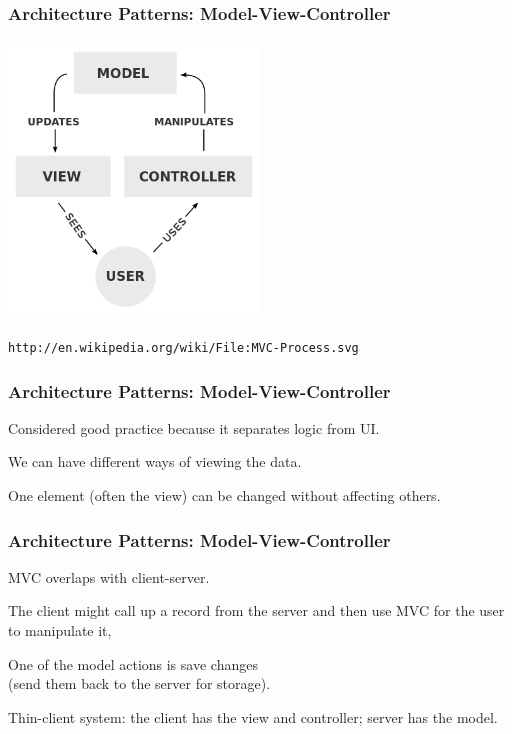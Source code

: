 \begin{frame}
\frametitle{Architecture Patterns: Model-View-Controller}
\begin{center}

	\includegraphics[width=0.5\textwidth]{images/mvc.png}
	
	\texttt{\small http://en.wikipedia.org/wiki/File:MVC-Process.svg}
\end{center}
\end{frame}


\begin{frame}
\frametitle{Architecture Patterns: Model-View-Controller}

\begin{changemargin}{1cm}
Considered good practice because it separates logic from UI.

We can have different ways of viewing the data. 

One element (often the view) can be changed without affecting others.
\end{changemargin}
\end{frame}

\begin{frame}
\frametitle{Architecture Patterns: Model-View-Controller}

\begin{changemargin}{1cm}
MVC overlaps with client-server.

The client might call up a record from the server and then use MVC for the user to manipulate it, 

One of the model actions is save changes\\
\quad (send them back to the server for storage). 

Thin-client system: the client has the view and controller; server has the model.

\end{changemargin}
\end{frame}

